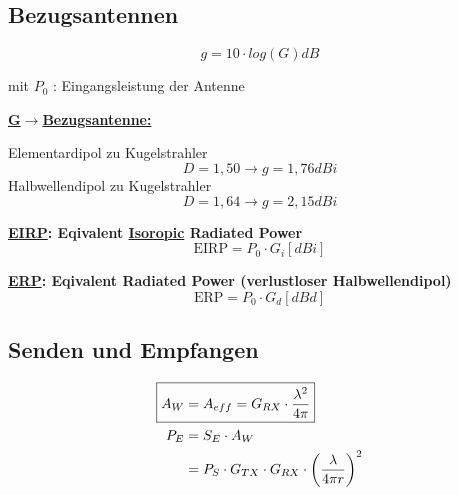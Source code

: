 \subsection{Bezugsantennen}
\[
    \boxed{g = 10 \cdot log(G)\si{dB}}
\]

mit $P_0$ : Eingangsleistung der Antenne

\begin{description}
    \item \textbf{\underline{G$\rightarrow$Bezugsantenne:}}

          Elementardipol  zu Kugelstrahler \[D = 1,50 \rightarrow g = 1,76\si{dBi}\]
          Halbwellendipol zu Kugelstrahler \[D = 1,64 \rightarrow g = 2,15\si{dBi}\]

    \item \textbf{\underline{EIRP}: Eqivalent \underline{Isoropic} Radiated Power}
          \[
              \text{EIRP} = P_0 \cdot G_i [\si{dBi}]
          \]

    \item \textbf{\underline{ERP}: Eqivalent Radiated Power (verlustloser Halbwellendipol)}
          \[
              \text{ERP} = P_0 \cdot G_d [\si{dBd}]
          \]
\end{description}

\subsection{Senden und Empfangen}


\begin{align*}
    \Aboxed{A_W & = A_{eff} = G_{RX}\cdot\frac{\lambda^2}{4\pi}}                           \\
    P_E         & = S_E\cdot A_W                                                           \\
                & = P_S\cdot G_{TX}\cdot G_{RX}\cdot \left(\frac{\lambda}{4\pi r}\right)^2
\end{align*}
